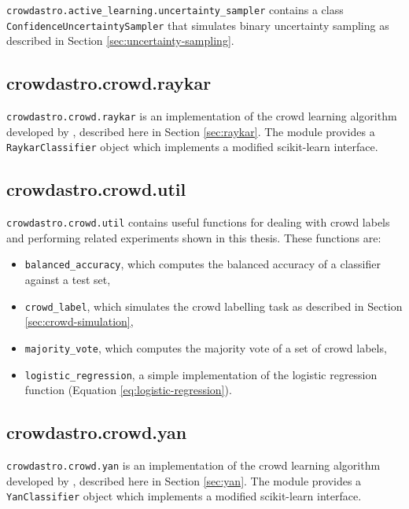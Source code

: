             \texttt{crowdastro.active\_learning.uncertainty\_sampler} contains a
            class \texttt{ConfidenceUncertaintySampler} that simulates binary
            uncertainty sampling as described in Section
            \ref{sec:uncertainty-sampling}.

    \subsection{crowdastro.crowd.raykar}
        \label{sec:crowdastro-raykar}

        \texttt{crowdastro.crowd.raykar} is an implementation of the crowd
        learning algorithm developed by \citet{raykar10}, described here in
        Section \ref{sec:raykar}. The module provides a
        \texttt{RaykarClassifier} object which implements a modified
        scikit-learn interface.

    \subsection{crowdastro.crowd.util}
        \label{sec:crowdastro-util}

        \texttt{crowdastro.crowd.util} contains useful functions for dealing
        with crowd labels and performing related experiments shown in this
        thesis. These functions are:
        \begin{itemize}
            \item \texttt{balanced\_accuracy}, which computes the balanced
                accuracy of a classifier against a test set,
            \item \texttt{crowd\_label}, which simulates the crowd labelling
                task as described in Section \ref{sec:crowd-simulation},
            \item \texttt{majority\_vote}, which computes the majority vote of
                a set of crowd labels,
            \item \texttt{logistic\_regression}, a simple implementation of the
                logistic regression function (Equation
                \ref{eq:logistic-regression}).
        \end{itemize}

    \subsection{crowdastro.crowd.yan}
        \label{sec:crowdastro-yan}

        \texttt{crowdastro.crowd.yan} is an implementation of the crowd
        learning algorithm developed by \citet{yan10}, described here in
        Section \ref{sec:yan}. The module provides a
        \texttt{YanClassifier} object which implements a modified scikit-learn
        interface.
